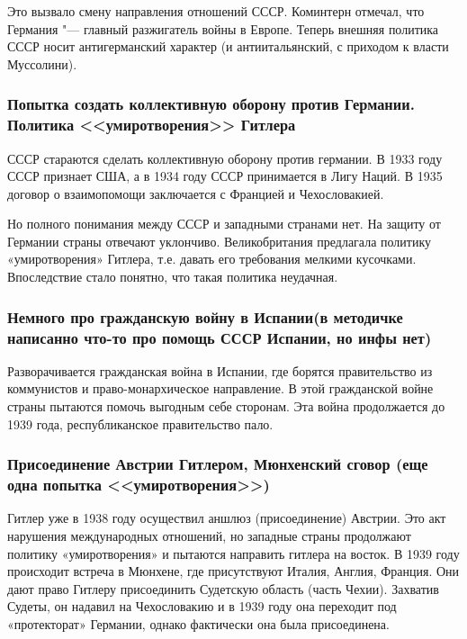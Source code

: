 Это вызвало смену направления отношений СССР. Коминтерн отмечал, что Германия "--- главный разжигатель войны в Европе. Теперь внешняя политика СССР носит антигерманский характер (и антиитальянский, с приходом к власти Муссолини). 

\subsubsection{\textbf{Попытка создать коллективную оборону против Германии. Политика <<умиротворения>> Гитлера}}

СССР стараются сделать коллективную оборону против германии. В 1933 году СССР признает США, а в 1934 году СССР принимается в Лигу Наций. В 1935 договор о взаимопомощи заключается с Францией и Чехословакией.

Но полного понимания между СССР и западными странами нет. На защиту от Германии страны отвечают уклончиво. Великобритания предлагала политику «умиротворения» Гитлера, т.е. давать его требования мелкими кусочками. Впоследствие стало понятно, что такая политика неудачная. 

\subsubsection{\textbf{Немного про гражданскую войну в Испании(в методичке написанно что-то про помощь СССР Испании, но инфы нет)}}

Разворачивается гражданская война в Испании, где борятся правительство из коммунистов и право-монархическое направление. В этой гражданской войне страны пытаются помочь выгодным себе сторонам. Эта война продолжается до 1939 года, республиканское правительство пало.

\subsubsection{\textbf{Присоединение Австрии Гитлером, Мюнхенский сговор (еще одна попытка <<умиротворения>>)}}

Гитлер уже в 1938 году осуществил аншлюз (присоединение) Австрии. Это акт нарушения международных отношений, но западные страны продолжают политику «умиротворения» и пытаются направить гитлера на восток. В 1939 году происходит встреча в Мюнхене, где присутствуют Италия, Англия, Франция. Они дают право Гитлеру присоединить Судетскую область (часть Чехии). Захватив Судеты, он надавил на Чехословакию и в 1939 году она переходит под «протекторат» Германии, однако фактически она была присоединена.

